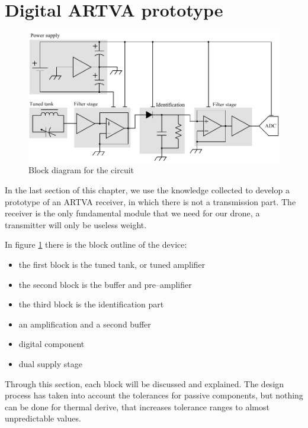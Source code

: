 \section{Digital ARTVA prototype}
\begin{figure}
	\centering
	\includegraphics[scale=0.7]{ch2/img/block_circuit.pdf}
	\caption{Block diagram for the circuit}
	\label{fig:block_circuit}	
\end{figure}
In the last section of this chapter, we use the knowledge collected to develop a prototype of an ARTVA receiver, in which there is not a transmission part. The receiver is the only fundamental module that we need for our drone, a transmitter will only be useless weight. 

In figure \ref{fig:block_circuit} there is the block outline of the device:
\begin{itemize}
\item the first block is the tuned tank, or tuned amplifier
\item the second block is the buffer and pre--amplifier
\item the third block is the identification part
\item an amplification and a second buffer
\item digital component
\item dual supply stage
\end{itemize}
Through this section, each block will be discussed and explained. The design process has taken into account the tolerances for passive components, but nothing can be done for thermal derive, that increases tolerance ranges to almost unpredictable values.

